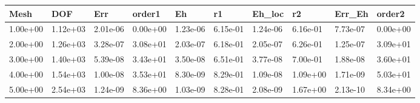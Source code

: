 \begin{tabular}{llllllllll}
Mesh & DOF & Err & order1 & Eh & r1 & Eh_loc & r2 & Err_Eh & order2 \\ 
\hline 
1.00e+00 & 1.12e+03 & 2.01e-06 & 0.00e+00 & 1.23e-06 & 6.15e-01 & 1.24e-06 & 6.16e-01 & 7.73e-07 & 0.00e+00 \\ 
2.00e+00 & 1.26e+03 & 3.28e-07 & 3.08e+01 & 2.03e-07 & 6.18e-01 & 2.05e-07 & 6.26e-01 & 1.25e-07 & 3.09e+01 \\ 
3.00e+00 & 1.40e+03 & 5.39e-08 & 3.43e+01 & 3.50e-08 & 6.51e-01 & 3.77e-08 & 7.00e-01 & 1.88e-08 & 3.60e+01 \\ 
4.00e+00 & 1.54e+03 & 1.00e-08 & 3.53e+01 & 8.30e-09 & 8.29e-01 & 1.09e-08 & 1.09e+00 & 1.71e-09 & 5.03e+01 \\ 
5.00e+00 & 2.54e+03 & 1.24e-09 & 8.36e+00 & 1.03e-09 & 8.28e-01 & 2.08e-09 & 1.67e+00 & 2.13e-10 & 8.34e+00 \\ 
\hline 
\end{tabular}